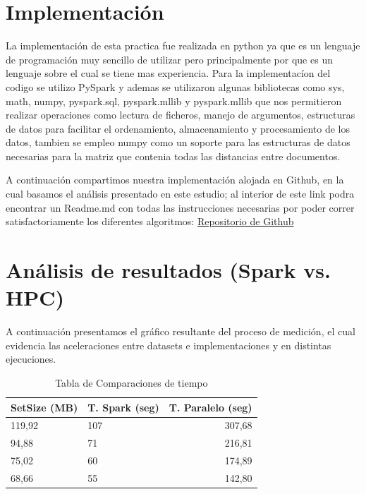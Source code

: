 \documentclass[fleqn,10pt]{SelfArx} %
\begin{document}
\section{Implementación}
La implementación de esta practica fue realizada en python ya que es un lenguaje de programación muy sencillo de utilizar pero principalmente por que es un lenguaje sobre el cual se tiene mas experiencia.
Para la implementacíon del codigo se utilizo PySpark y ademas se utilizaron algunas bibliotecas como sys, math, numpy, pyspark.sql, pyspark.mllib y pyspark.mllib que nos permitieron realizar operaciones como lectura de ficheros, manejo de argumentos, estructuras de datos para facilitar el ordenamiento, almacenamiento y procesamiento de los datos, tambien se empleo numpy como un soporte para las estructuras de datos necesarias para la matriz que contenia todas las distancias entre documentos.


A continuación compartimos nuestra implementación alojada en Github, en la cual basamos el análisis presentado en este estudio; al interior de este link podra encontrar un Readme.md con todas las instrucciones necesarias por poder correr satisfactoriamente los diferentes algoritmos: \href{https://github.com/jonyzp/Spark-Document-Clustering}{Repositorio de Github}

\section{Análisis de resultados (Spark vs. HPC)}

A continuación presentamos el gráfico resultante del proceso de medición, el cual evidencia las aceleraciones entre datasets e implementaciones y en distintas ejecuciones.

\begin{table}[hbt]
	\caption{Tabla de Comparaciones de tiempo}
	\centering
	\begin{tabular}{llr}
		\cmidrule(r){1-3}
		SetSize (MB) & T. Spark (seg) & T. Paralelo (seg)\\
		\midrule
		
		119,92 & 107 & 307,68 \\
		
		94,88 & 71 & 216,81 \\
		
		75,02 & 60 & 174,89 \\
		
		68,66 & 55 & 142,80 \\
		
		\bottomrule
	\end{tabular}
	\label{tab:label}
\end{table}
\end{document}
